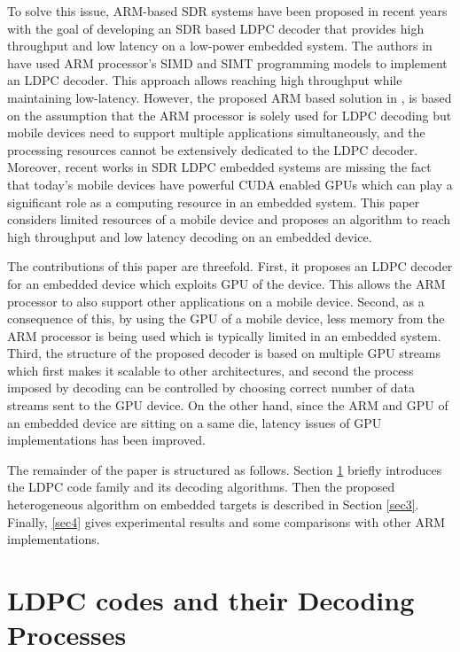 \documentclass[conference]{IEEEtran}
\begin{document}
To solve this issue, ARM-based SDR systems have been proposed in recent years \cite{art_neon, art_ldpc_cpu0} with the goal of developing an SDR based LDPC decoder that provides high throughput and low latency on a low-power embedded system. The authors in \cite{art_neon} have used ARM processor's SIMD and SIMT programming models to implement an LDPC decoder. This approach allows reaching high throughput while maintaining low-latency. However, the proposed ARM based solution in \cite{art_neon}, is based on the assumption that the ARM processor is solely used for LDPC decoding but mobile devices need to support multiple applications simultaneously, and the processing resources cannot be extensively dedicated to the LDPC decoder. Moreover, recent works in SDR LDPC embedded systems are missing the fact that today's mobile devices have powerful CUDA enabled GPUs which can play a significant role as a computing resource in an embedded system. This paper considers limited resources of a mobile device and proposes an algorithm to reach high throughput and low latency decoding on an embedded device.

The contributions of this paper are threefold. First, it proposes an LDPC decoder for an embedded device which exploits GPU of the device. This allows the ARM processor to also support other applications on a mobile device. Second, as a consequence of this, by using the GPU of a mobile device, less memory from the ARM processor is being used which is typically limited in an embedded system. Third, the structure of the proposed decoder is based on multiple GPU streams which first makes it scalable to other architectures, and second the process imposed by decoding can be controlled by choosing correct number of data streams sent to the GPU device. On the other hand, since the ARM and GPU of an embedded device are sitting on a same die, latency issues of GPU implementations has been improved.

The remainder of the paper is structured as follows. Section \ref{sec2} briefly introduces the LDPC code family and its decoding algorithms. Then the proposed heterogeneous algorithm on embedded targets is described in Section \ref{sec3}. Finally, \ref{sec4} gives experimental results and some comparisons with other ARM implementations.

\section{LDPC codes and their Decoding Processes}\label{sec2}
\end{document}

